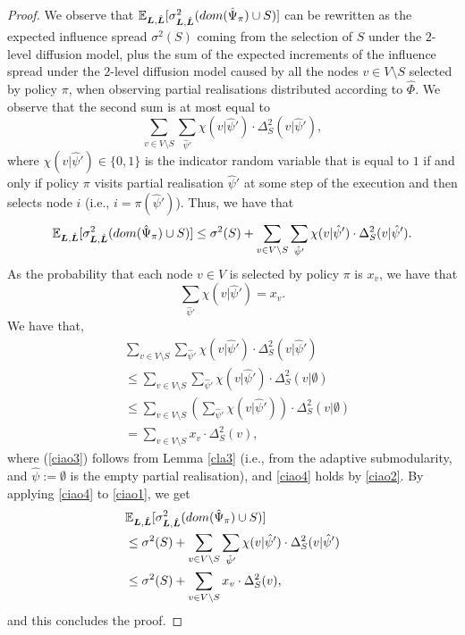\begin{proof}
We observe that $\mathbb{E}_{\bm L,\hat{\bm L}}[\sigma^2_{\bm L,\hat{\bm L}}(dom(\hat{\Psi}_{\pi})\cup S)]$ can be rewritten as the expected influence spread $\sigma^2(S)$ coming from the selection of $S$ under the $2$-level diffusion model, plus the sum of the expected increments of the influence spread under the $2$-level diffusion model caused by all the nodes $v\in V\setminus S$ selected by policy $\pi$, when observing partial realisations distributed according to $\hat{\Phi}$. We observe that the second sum is at most equal to $$\sum_{v\in V\setminus S}\sum_{\hat{\psi}'}\chi(v|\hat{\psi}')\cdot \Delta^2_S(v|\hat{\psi}'),$$ where $\chi(v|\hat{\psi}')\in \{0,1\}$ is the indicator random variable that is equal to $1$ if and only if policy $\pi$ visits partial realisation $\hat{\psi}'$ at some step of the execution and then selects node $i$ (i.e., $i=\pi(\hat{\psi}')$). Thus, we have that
\begin{align}
\mathbb{E}_{\bm L,\hat{\bm L}}[\sigma^2_{\bm L,\hat{\bm L}}(dom(\hat{\Psi}_{\pi})\cup S)]\leq \sigma^2(S)+\sum_{v\in V\setminus S}\sum_{\hat{\psi}'}\chi(v|\hat{\psi}')\cdot \Delta^2_S(v|\hat{\psi}').\label{ciao1}
\end{align}
As the probability that each node $v\in V$ is selected by policy $\pi$ is $x_v$, we have that 
\begin{equation}\label{ciao2}
\sum_{\hat{\psi}'}\chi(v|\hat{\psi}')=x_v.
\end{equation}
We have that,
\begin{align}
&\sum_{v\in V\setminus S}\sum_{\hat{\psi}'}\chi(v|\hat{\psi}')\cdot \Delta^2_S(v|\hat{\psi}')\nonumber\\
&\leq \sum_{v\in V\setminus S}\sum_{\hat{\psi}'}\chi(v|\hat{\psi}')\cdot \Delta^2_S(v|\emptyset)\label{ciao3}\\
&\leq \sum_{v\in V\setminus S}\left(\sum_{\hat{\psi}'}\chi(v|\hat{\psi}')\right)\cdot \Delta^2_S(v|\emptyset)\nonumber\\
&=\sum_{v\in V\setminus S}x_v\cdot \Delta^2_S(v),\label{ciao4}
\end{align}
where (\ref{ciao3}) follows from Lemma \ref{cla3} (i.e., from the adaptive submodularity, and $\hat{\psi}:=\emptyset$ is the empty partial realisation), and \eqref{ciao4} holds by \eqref{ciao2}.
By applying \eqref{ciao4} to \eqref{ciao1}, we get
\begin{align*}
&\mathbb{E}_{\bm L,\hat{\bm L}}[\sigma^2_{\bm L,\hat{\bm L}}(dom(\hat{\Psi}_{\pi})\cup S)]\\
&\leq\sigma^2(S)+\sum_{v\in V\setminus S}\sum_{\hat{\psi}'}\chi(v|\hat{\psi}')\cdot \Delta^2_S(v|\hat{\psi}')\\
&\leq \sigma^2(S)+\sum_{v\in V\setminus S}x_v\cdot \Delta^2_S(v),
\end{align*}
and this concludes the proof. 
\end{proof}




